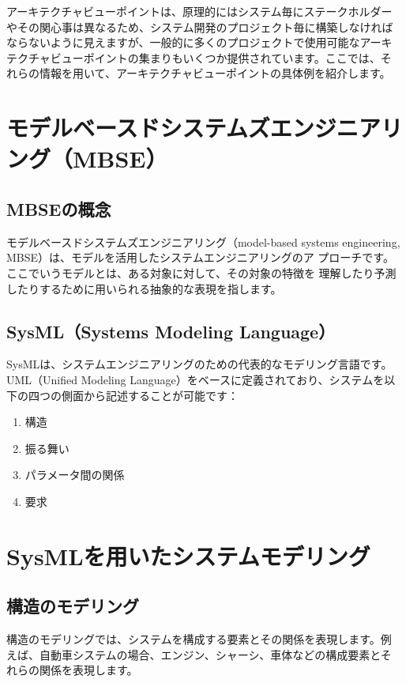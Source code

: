 アーキテクチャビューポイントは、原理的にはシステム毎にステークホルダー
やその関心事は異なるため、システム開発のプロジェクト毎に構築しなければ
ならないように見えますが、一般的に多くのプロジェクトで使用可能なアーキ
テクチャビューポイントの集まりもいくつか提供されています。ここでは、そ
れらの情報を用いて、アーキテクチャビューポイントの具体例を紹介します。

\section{モデルベースドシステムズエンジニアリング（MBSE）}

\subsection{MBSEの概念}

モデルベースドシステムズエンジニアリング（model-based systems
  engineering, MBSE）は、モデルを活用したシステムエンジニアリングのア
プローチです。ここでいうモデルとは、ある対象に対して、その対象の特徴を
理解したり予測したりするために用いられる抽象的な表現を指します。

\subsection{SysML（Systems Modeling Language）}

SysMLは、システムエンジニアリングのための代表的なモデリング言語です。
UML（Unified Modeling Language）をベースに定義されており、システムを以
下の四つの側面から記述することが可能です：

\begin{enumerate}
    \item 構造
    \item 振る舞い
    \item パラメータ間の関係
    \item 要求
\end{enumerate}

\section{SysMLを用いたシステムモデリング}

\subsection{構造のモデリング}

構造のモデリングでは、システムを構成する要素とその関係を表現します。例
えば、自動車システムの場合、エンジン、シャーシ、車体などの構成要素とそ
れらの関係を表現します。

